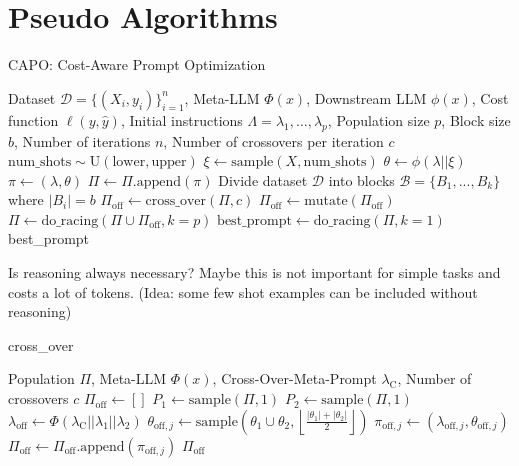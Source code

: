 \section{Pseudo Algorithms}

\begin{algorithm}[h]
    \caption{CAPO: Cost-Aware Prompt Optimization}
    \begin{algorithmic}[1]
        \Require Dataset $\mathcal{D} = \{(X_i, y_i)\}_{i=1}^n$, Meta-LLM $\Phi(x)$,
        Downstream LLM $\phi(x)$, Cost function $\ell(y, \hat{y})$,
        Initial instructions $\Lambda = {\lambda_1, \dots, \lambda_p}$,
        Population size $p$, Block size $b$, Number of iterations $n$, Number of crossovers per iteration $c$
        \For{$\lambda \in \Lambda$}
        \State $\text{num\_shots} \sim \text{U}(\text{lower}, \text{upper})$
        \State $\xi \gets \text{sample}(X, \text{num\_shots})$ 
        \State $\theta \gets \phi(\lambda||\xi)$   
        \State $\pi \gets (\lambda, \theta)$
        \State $\Pi \gets \Pi\text{.append}(\pi)$
        \EndFor
        \State Divide dataset $\mathcal{D}$ into blocks $\mathcal{B} = \{B_1, ..., B_k\}$ where $|B_i| = b$
        \State $\Pi_{\text{off}} \gets \text{cross\_over}(\Pi, c)$
        \State $\Pi_{\text{off}} \gets \text{mutate}(\Pi_{\text{off}})$
        \State $\Pi \gets \text{do\_racing}(\Pi \cup \Pi_\text{off}, k=p)$
        \EndFor
        \State $\text{best\_prompt} \gets \text{do\_racing}(\Pi, k=1)$
        \State \Return best\_prompt
    \end{algorithmic}
\end{algorithm}

\noindent Is reasoning always necessary? Maybe this is not important for simple tasks and costs a lot of tokens. (Idea: some few shot examples can be included without reasoning)\\
\newpage

\begin{algorithm}[h]
    \caption{cross\_over}
    \begin{algorithmic}[1]
        \Require Population $\Pi$, Meta-LLM $\Phi(x)$, Cross-Over-Meta-Prompt $\lambda_{\text{C}}$, Number of crossovers $c$
        \State $\Pi_{\text{off}} \gets  []$
        \State $P_1 \gets \text{sample}(\Pi, 1)$ 
        \State $P_2 \gets \text{sample}(\Pi, 1)$ 
        \State $\lambda_{\text{off}} \gets \Phi(\lambda_{\text{C}} || \lambda_1 || \lambda_2)$ 
        \State $\theta_{\text{off},j} \gets \text{sample}(\theta_1 \cup \theta_2, \left\lfloor\frac{|\theta_1|+|\theta_2|}{2}\right\rfloor)$ 
        \State $\pi_{\text{off},j} \gets (\lambda_{\text{off},j}, \theta_{\text{off},j})$
        \State $\Pi_{\text{off}} \gets \Pi_{\text{off}}.\text{append}(\pi_{\text{off},j})$
        \EndFor
        \State \Return $\Pi_{\text{off}}$
    \end{algorithmic}
\end{algorithm}

